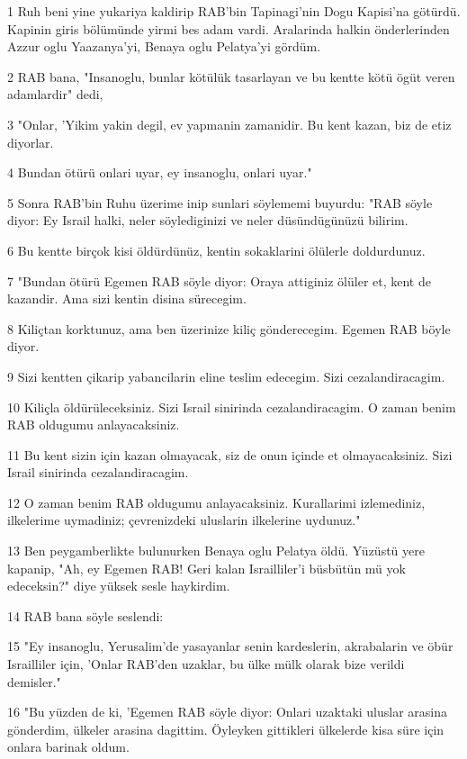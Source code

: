 \par 1 Ruh beni yine yukariya kaldirip RAB'bin Tapinagi'nin Dogu Kapisi'na götürdü. Kapinin giris bölümünde yirmi bes adam vardi. Aralarinda halkin önderlerinden Azzur oglu Yaazanya'yi, Benaya oglu Pelatya'yi gördüm.
\par 2 RAB bana, "Insanoglu, bunlar kötülük tasarlayan ve bu kentte kötü ögüt veren adamlardir" dedi,
\par 3 "Onlar, 'Yikim yakin degil, ev yapmanin zamanidir. Bu kent kazan, biz de etiz diyorlar.
\par 4 Bundan ötürü onlari uyar, ey insanoglu, onlari uyar."
\par 5 Sonra RAB'bin Ruhu üzerime inip sunlari söylememi buyurdu: "RAB söyle diyor: Ey Israil halki, neler söylediginizi ve neler düsündügünüzü bilirim.
\par 6 Bu kentte birçok kisi öldürdünüz, kentin sokaklarini ölülerle doldurdunuz.
\par 7 "Bundan ötürü Egemen RAB söyle diyor: Oraya attiginiz ölüler et, kent de kazandir. Ama sizi kentin disina sürecegim.
\par 8 Kiliçtan korktunuz, ama ben üzerinize kiliç gönderecegim. Egemen RAB böyle diyor.
\par 9 Sizi kentten çikarip yabancilarin eline teslim edecegim. Sizi cezalandiracagim.
\par 10 Kiliçla öldürüleceksiniz. Sizi Israil sinirinda cezalandiracagim. O zaman benim RAB oldugumu anlayacaksiniz.
\par 11 Bu kent sizin için kazan olmayacak, siz de onun içinde et olmayacaksiniz. Sizi Israil sinirinda cezalandiracagim.
\par 12 O zaman benim RAB oldugumu anlayacaksiniz. Kurallarimi izlemediniz, ilkelerime uymadiniz; çevrenizdeki uluslarin ilkelerine uydunuz."
\par 13 Ben peygamberlikte bulunurken Benaya oglu Pelatya öldü. Yüzüstü yere kapanip, "Ah, ey Egemen RAB! Geri kalan Israilliler'i büsbütün mü yok edeceksin?" diye yüksek sesle haykirdim.
\par 14 RAB bana söyle seslendi:
\par 15 "Ey insanoglu, Yerusalim'de yasayanlar senin kardeslerin, akrabalarin ve öbür Israilliler için, 'Onlar RAB'den uzaklar, bu ülke mülk olarak bize verildi demisler."
\par 16 "Bu yüzden de ki, 'Egemen RAB söyle diyor: Onlari uzaktaki uluslar arasina gönderdim, ülkeler arasina dagittim. Öyleyken gittikleri ülkelerde kisa süre için onlara barinak oldum.

